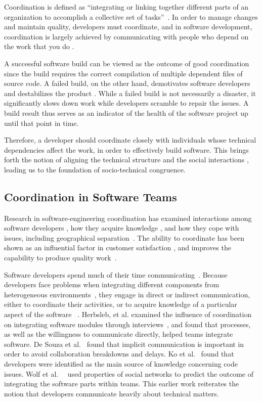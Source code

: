 Coordination is defined as ``integrating or linking together different parts of an organization to accomplish a collective set of tasks''~\cite{vandeven1976}. In order to manage changes and maintain quality, developers must coordinate, and in software development, coordination is largely achieved by communicating with people who depend on the work that you do \cite{kraut:1995coordination}.

A successful software build can be viewed as the outcome of good coordination since the build requires the correct compilation of multiple dependent files of source code.
A failed build, on the other hand, demotivates software developers \cite{holck2004,damian:icgse:2007} and destabilizes the product \cite{cusumano1997}.
While a failed build is not necessarily a disaster, it significantly slows down work while developers scramble to repair the issues.
A build result thus serves as an indicator of the health of the software project up until that point in time.

Therefore, a developer should coordinate closely with individuals whose technical dependencies affect the work, in order to effectively build software. This brings forth the notion of aligning the technical structure and the social interactions \cite{herbsleb2007:fose}, leading us to the foundation of socio-technical congruence.

\subsection{Coordination in Software Teams}
Research in software-engineering coordination has examined interactions among
software developers \cite{carter2004,marczak:re:2008}, how they acquire
knowledge \cite{ehrlich:icgse:2006,nakakoji2010:rdc}, and
how they cope with issues, including geographical
separation~\cite{espinosa2007:team_knowledge,herbsleb2003:speed}.
The ability to coordinate has
been shown as an influential factor in customer satisfaction \cite{kraut:1995coordination}, and  improves the capability to produce quality work~\cite{faraj2000}.


Software developers spend much of their time
communicating~\cite{perry94}. Because developers face
problems when integrating different components from heterogeneous environments~\cite{redmiles2007:continuous},
they engage in direct or indirect
communication, either to coordinate their activities, or to acquire knowledge of
a particular aspect of the software ~\cite{nakakoji2010:rdc}.
Herbsleb, et al. examined the influence of coordination on integrating software
modules through interviews~\cite{herbsleb1999:architectures}, and found that
processes, as well as the willingness to communicate directly, helped teams
integrate software. De Souza et al.~\cite{desouza2007:awarenessnetwork} found that implicit
communication is important in order to avoid collaboration breakdowns and delays. Ko et al.~\cite{ko:icse:2007} found that developers were identified as the main source of knowledge concerning code issues.
Wolf et al.~~\cite{wolf:icse:2009} used properties of social networks to predict the outcome of integrating the software parts within teams.
This earlier work reiterates the notion that developers communicate heavily about technical matters.

